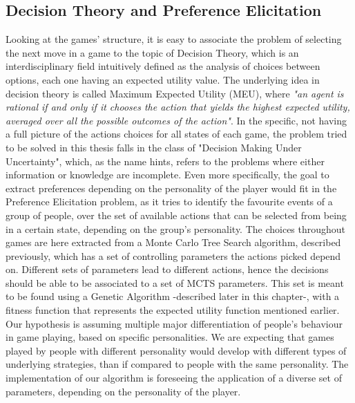 \subsection{Decision Theory and Preference Elicitation}
Looking at the games' structure, it is easy to associate the problem of selecting the next move in a game to the topic of Decision Theory, which is an interdisciplinary field intuitively defined as the analysis of choices between options, each one having an expected utility value. The underlying idea in decision theory is called Maximum Expected Utility (MEU), where \emph{"an agent is rational if and only if it chooses the action that yields the highest expected utility, averaged over all the possible outcomes of the action"}\cite{russell1995modern}. In the specific, not having a full picture of the actions choices for all states of each game, the problem tried to be solved in this thesis falls in the class of "Decision Making Under Uncertainty", which, as the name hints, refers to the problems where either information or knowledge are incomplete\cite[p.~3-4]{scholz1983decision}. Even more specifically, the goal to extract preferences depending on the personality of the player would fit in the Preference Elicitation problem, as it tries to identify the favourite events of a group of people, over the set of available actions that can be selected from being in a certain state, depending on the group's personality. The choices throughout games are here extracted from a Monte Carlo Tree Search algorithm, described previously, which has a set of controlling parameters the actions picked depend on. Different sets of parameters lead to different actions, hence the decisions should be able to be associated to a set of MCTS parameters. This set is meant to be found using a Genetic Algorithm -described later in this chapter-, with a fitness function that represents the expected utility function mentioned earlier.
Our hypothesis is assuming multiple major differentiation of people's behaviour in game playing, based on specific personalities. We are expecting that games played by people with different personality would develop with different types of underlying strategies, than if compared to people with the same personality. The implementation of our algorithm is foreseeing the application of a diverse set of parameters, depending on the personality of the player.\\
